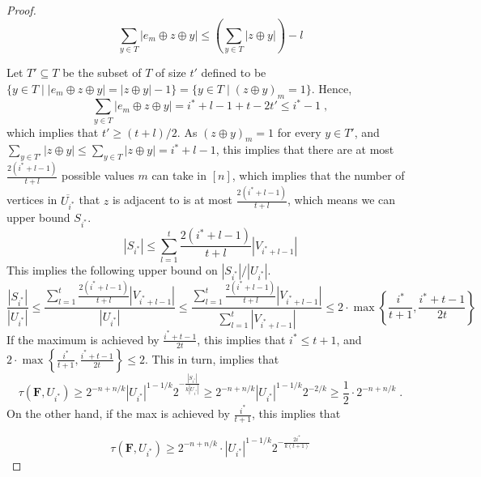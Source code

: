 \documentclass[11pt, letterpaper]{article}
\theoremstyle{definition}
\newcommand{\f}{\mathbf{F}}
\begin{document}
\begin{proof}
\begin{equation} \label{eqn:lowerbound}
    \sum_{y \in T}|e_m \oplus z \oplus y| \leq \left(\sum_{y \in T} |z \oplus y|\right) -l
\end{equation}

\noindent
Let $T' \subseteq T$ be the subset of $T$ of size $t'$ defined to be $\{y \in T \mid |e_m \oplus z \oplus y| = |z \oplus y| -1\}= \{y \in T \mid (z \oplus y)_m=1\}$. Hence, 
\begin{equation*}
    \sum_{y \in T}|e_m \oplus z \oplus y|= i^*+l-1+t-2t'\leq i^*-1 \; ,
\end{equation*}
which implies that $t' \geq (t+l)/2$. As $(z \oplus y)_m = 1$ for every $y \in T'$, and $\sum_{y \in T'}|z \oplus y| \leq \sum_{y \in T}|z \oplus y|=i^*+l-1$, this implies that there are at most $\frac{2(i^*+l-1)}{t+l}$ possible values $m$ can take in $[n]$, which implies that the number of vertices in $\overline{U_{i^*}}$ that $z$ is adjacent to is at most $\frac{2(i^*+l-1)}{t+l}$, which means we can upper bound $S_{i^*}$. 
\begin{equation*}
    |S_{i^*}| \leq \sum_{l=1}^{t} \frac{2(i^*+l-1)}{t+l} |V_{i^*+l-1}|
\end{equation*}
This implies the following upper bound on $|S_{i^*}|/|U_{i^*}|$. 
\begin{equation}
    \frac{|S_{i^*}|}{|U_{i^*}|} \leq \frac{\sum_{l=1}^{t}\frac{2(i^*+l-1)}{t+l} |V_{i^*+l-1}|}{|U_{i^*}|} \leq \frac{\sum_{l=1}^{t}\frac{2(i^*+l-1)}{t+l} |V_{i^*+l-1}|}{\sum_{l=1}^{t}|V_{i^*+l-1}|} \leq 2 \cdot \max\left\{ \frac{i^*}{t+1}, \frac{i^*+t-1}{2t} \right\}
\end{equation}
\noindent
If the maximum is achieved by $\frac{i^*+t-1}{2t}$, this implies that $i^* \leq t+1$, and $2\cdot \max\left\{ \frac{i^*}{t+1}, \frac{i^*+t-1}{2t} \right\} \leq 2$. This in turn, implies that $$\tau(\f, U_{i^*}) \geq 2^{-n+n/k}|U_{i^*}|^{1-1/k}2^{-\frac{|S_{i^*}|}{k |U_{i^*}|}} \geq 2^{-n+n/k}|U_{i^*}|^{1-1/k} 2^{-2/k} \geq \frac{1}{2} \cdot 2^{-n+n/k}\;.$$  On the other hand, if the max is achieved by $\frac{i^*}{t+1}$, this implies that 

\begin{equation}
    \tau(\f, U_{i^*}) \geq 2^{-n+n/k} \cdot |U_{i^*}|^{1-1/k}2^{-\frac{2 i^*}{k(t+1)}}
\end{equation}

\end{proof}
\end{document}
